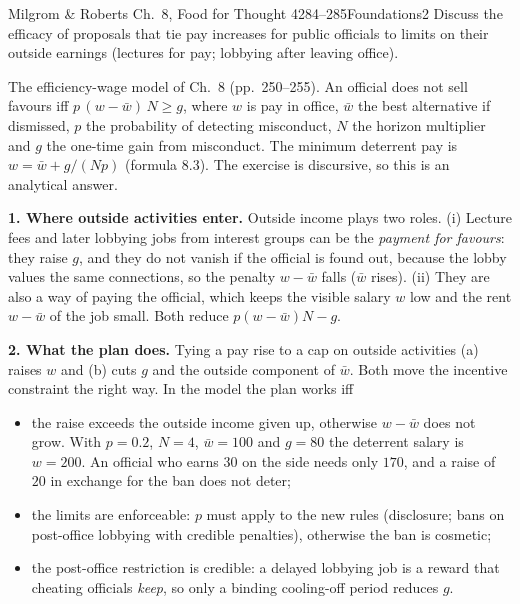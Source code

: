 \begin{exsol}{Milgrom \& Roberts Ch.~8, Food for Thought 4}{284--285}{Foundations}{2}
\asked Discuss the efficacy of proposals that tie pay increases for public officials to limits on their
outside earnings (lectures for pay; lobbying after leaving office).

\method The efficiency-wage model of Ch.~8 (pp.~250--255). An official does not sell favours iff
$p\,(w - \bar w)\,N \ge g$, where $w$ is pay in office, $\bar w$ the best alternative if dismissed, $p$ the
probability of detecting misconduct, $N$ the horizon multiplier and $g$ the one-time gain from
misconduct. The minimum deterrent pay is $w = \bar w + g/(Np)$ (formula 8.3). The exercise is discursive,
so this is an analytical answer.

\solution
\textbf{1. Where outside activities enter.} Outside income plays two roles.
(i) Lecture fees and later lobbying jobs from interest groups can be the \emph{payment for favours}: they
raise $g$, and they do not vanish if the official is found out, because the lobby values the same
connections, so the penalty $w - \bar w$ falls ($\bar w$ rises).
(ii) They are also a way of paying the official, which keeps the visible salary $w$ low and the rent
$w - \bar w$ of the job small. Both reduce $p(w-\bar w)N - g$.

\textbf{2. What the plan does.} Tying a pay rise to a cap on outside activities (a) raises $w$ and
(b) cuts $g$ and the outside component of $\bar w$. Both move the incentive constraint the right way.
In the model the plan works iff
\begin{itemize}
  \item the raise exceeds the outside income given up, otherwise $w - \bar w$ does not grow. With $p = 0.2$,
  $N = 4$, $\bar w = 100$ and $g = 80$ the deterrent salary is $w = 200$. An official who earns $30$ on the
  side needs only $170$, and a raise of $20$ in exchange for the ban does not deter;
  \item the limits are enforceable: $p$ must apply to the new rules (disclosure; bans on post-office
  lobbying with credible penalties), otherwise the ban is cosmetic;
  \item the post-office restriction is credible: a delayed lobbying job is a reward that cheating
  officials \emph{keep}, so only a binding cooling-off period reduces $g$.
\end{itemize}


\end{exsol}
